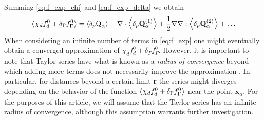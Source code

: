 \documentclass[11pt]{My_preprint}
\providecommand{\DIFadd}[1]{{\protect\color{blue}\uwave{#1}}} %
\providecommand{\DIFdel}[1]{{\protect\color{red}\sout{#1}}}                      %
\providecommand{\DIFaddbegin}{} %
\providecommand{\DIFaddend}{} %
\providecommand{\DIFdelbegin}{} %
\providecommand{\DIFdelend}{} %
\begin{document}
Summing \ref{eq:f_exp_chi} and \ref{eq:f_exp_delta} we obtain
\begin{equation}
    \avg{\chi_df_d^0+\delta_\Gamma  f_\Gamma ^0} = \pavg{\text Q_\alpha}
    - \div  
    \pavg{\textbf{Q}_\alpha^{(1)}}        
    + \frac{1}{2} \grad\grad : \pavg{\textbf{Q}_{\alpha}^{(2)}}
    + \ldots  \label{eq:f_exp}
\end{equation}
When considering an infinite number of terms in \ref{eq:f_exp} one might eventually obtain a converged approximation of \DIFdelbegin \DIFdel{$\chi_d f_d^0+\delta_\Gamma  f_\Gamma ^0$}\DIFdelend \DIFaddbegin \DIFadd{$\avg{\chi_d f_d^0+\delta_\Gamma  f_\Gamma ^0}$}\DIFaddend . 
However, it is important to note that Taylor series have what is known as a \textit{radius of convergence} beyond which adding more terms does not necessarily improve the approximation \citep[Chapter 1]{appel2007}. 
In particular, for distances beyond a certain limit \textbf{r} the series might diverges depending on the behavior of the function $\avg{\chi_d f_d^0+\delta_\Gamma  f_\Gamma ^0}$ near the point \DIFdelbegin \DIFdel{$\textbf{x}_\alpha$}\DIFdelend \DIFaddbegin \DIFadd{$\textbf{x}$}\DIFaddend . 
For the purposes of this article, we will assume that the Taylor series has an infinite radius of convergence, although this assumption warrants further investigation.
\end{document}
